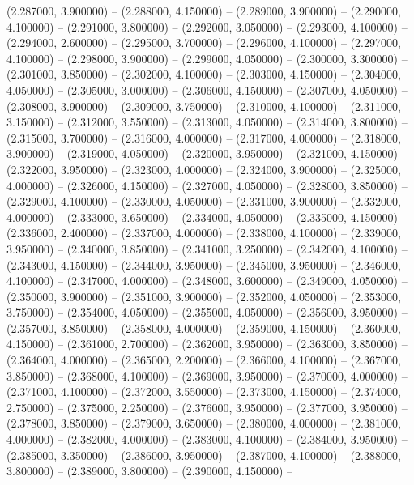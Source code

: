 (2.287000, 3.900000) -- 
(2.288000, 4.150000) -- 
(2.289000, 3.900000) -- 
(2.290000, 4.100000) -- 
(2.291000, 3.800000) -- 
(2.292000, 3.050000) -- 
(2.293000, 4.100000) -- 
(2.294000, 2.600000) -- 
(2.295000, 3.700000) -- 
(2.296000, 4.100000) -- 
(2.297000, 4.100000) -- 
(2.298000, 3.900000) -- 
(2.299000, 4.050000) -- 
(2.300000, 3.300000) -- 
(2.301000, 3.850000) -- 
(2.302000, 4.100000) -- 
(2.303000, 4.150000) -- 
(2.304000, 4.050000) -- 
(2.305000, 3.000000) -- 
(2.306000, 4.150000) -- 
(2.307000, 4.050000) -- 
(2.308000, 3.900000) -- 
(2.309000, 3.750000) -- 
(2.310000, 4.100000) -- 
(2.311000, 3.150000) -- 
(2.312000, 3.550000) -- 
(2.313000, 4.050000) -- 
(2.314000, 3.800000) -- 
(2.315000, 3.700000) -- 
(2.316000, 4.000000) -- 
(2.317000, 4.000000) -- 
(2.318000, 3.900000) -- 
(2.319000, 4.050000) -- 
(2.320000, 3.950000) -- 
(2.321000, 4.150000) -- 
(2.322000, 3.950000) -- 
(2.323000, 4.000000) -- 
(2.324000, 3.900000) -- 
(2.325000, 4.000000) -- 
(2.326000, 4.150000) -- 
(2.327000, 4.050000) -- 
(2.328000, 3.850000) -- 
(2.329000, 4.100000) -- 
(2.330000, 4.050000) -- 
(2.331000, 3.900000) -- 
(2.332000, 4.000000) -- 
(2.333000, 3.650000) -- 
(2.334000, 4.050000) -- 
(2.335000, 4.150000) -- 
(2.336000, 2.400000) -- 
(2.337000, 4.000000) -- 
(2.338000, 4.100000) -- 
(2.339000, 3.950000) -- 
(2.340000, 3.850000) -- 
(2.341000, 3.250000) -- 
(2.342000, 4.100000) -- 
(2.343000, 4.150000) -- 
(2.344000, 3.950000) -- 
(2.345000, 3.950000) -- 
(2.346000, 4.100000) -- 
(2.347000, 4.000000) -- 
(2.348000, 3.600000) -- 
(2.349000, 4.050000) -- 
(2.350000, 3.900000) -- 
(2.351000, 3.900000) -- 
(2.352000, 4.050000) -- 
(2.353000, 3.750000) -- 
(2.354000, 4.050000) -- 
(2.355000, 4.050000) -- 
(2.356000, 3.950000) -- 
(2.357000, 3.850000) -- 
(2.358000, 4.000000) -- 
(2.359000, 4.150000) -- 
(2.360000, 4.150000) -- 
(2.361000, 2.700000) -- 
(2.362000, 3.950000) -- 
(2.363000, 3.850000) -- 
(2.364000, 4.000000) -- 
(2.365000, 2.200000) -- 
(2.366000, 4.100000) -- 
(2.367000, 3.850000) -- 
(2.368000, 4.100000) -- 
(2.369000, 3.950000) -- 
(2.370000, 4.000000) -- 
(2.371000, 4.100000) -- 
(2.372000, 3.550000) -- 
(2.373000, 4.150000) -- 
(2.374000, 2.750000) -- 
(2.375000, 2.250000) -- 
(2.376000, 3.950000) -- 
(2.377000, 3.950000) -- 
(2.378000, 3.850000) -- 
(2.379000, 3.650000) -- 
(2.380000, 4.000000) -- 
(2.381000, 4.000000) -- 
(2.382000, 4.000000) -- 
(2.383000, 4.100000) -- 
(2.384000, 3.950000) -- 
(2.385000, 3.350000) -- 
(2.386000, 3.950000) -- 
(2.387000, 4.100000) -- 
(2.388000, 3.800000) -- 
(2.389000, 3.800000) -- 
(2.390000, 4.150000) -- 
